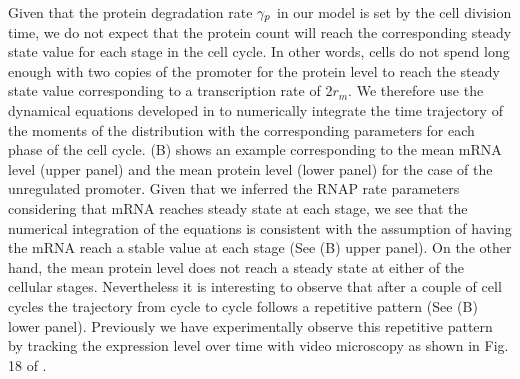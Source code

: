 Given that the protein degradation rate $\gamma _p$ in our model is set by the cell
division time, we do not expect that the protein count will reach the
corresponding steady state value for each stage in the cell cycle. In other
words, cells do not spend long enough with two copies of the promoter for the
protein level to reach the steady state value corresponding to a transcription
rate of $2 r_m$. We therefore use the dynamical equations developed in
 to numerically integrate the time trajectory of the moments
of the distribution with the corresponding parameters for each phase of the cell
cycle. (B) shows an example corresponding to the mean mRNA
level (upper panel) and the mean protein level (lower panel) for the case of the
unregulated promoter. Given that we inferred the RNAP rate parameters
considering that mRNA reaches steady state at each stage, we see that the
numerical integration of the equations is consistent with the assumption of
having the mRNA reach a stable value at each stage (See
(B) upper panel). On the other hand, the mean protein
level does not reach a steady state at either of the cellular stages.
Nevertheless it is interesting to observe that after a couple of cell cycles the
trajectory from cycle to cycle follows a repetitive pattern (See
(B) lower panel). Previously we have experimentally
observe this repetitive pattern by tracking the expression level over time with
video microscopy as shown in Fig. 18 of \cite{Phillips2018}.

